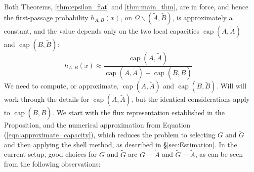 \documentclass[nofootinbib,english, aip, jcp, priprint, graphicx,floatfix]{revtex4-1}
\theoremstyle{plain}
\theoremstyle{definition}
\theoremstyle{plain}
\newcommand{\capac}[2]{\ensuremath{\operatorname{cap}}(#1,#2)}
\newcommand{\dA}{{\dot A}}
\newcommand{\tA}{{\tilde A}}
\newcommand{\tB}{{\tilde B}}
\begin{document}
Both Theorems, \ref{thm:epsilon_flat} and \ref{thm:main_thm}, are in force, and hence the first-passage probability $h_{A,B}(x)$, on $\Omega\backslash(\tA,\tB)$, is approximately a constant, and the value depends only on the two local capacities $\capac{A}{\tA}$ and
$\capac{B}{\tB}$:
\[
 h_{A,B} (x) \approx \frac{\capac{A}{\tilde A}}{\capac{A}{\tilde A}+\capac{B}{\tilde B}}
 \]
We need to compute, or approximate, $\capac{A}{\tA}$ and $\capac{B}{\tB}$. Will will work through the details for $\capac{A}{\tA}$, but the identical considerations apply to 
$\capac{B}{\tilde B}$.  We start with the flux representation
established in the Proposition, and the numerical approximation from Equation (\ref{eqn:approximate_capacity}), which reduces the problem to selecting $G$ and $\tilde G$ and then applying the shell method, as described in \S\ref{sec:Estimation}.
In the current setup, 
good choices for $G$ and $\tilde G$ are $G=\dA$ and 
$\tilde G = \tA$, as can be seen from the following observations:
\end{document}
